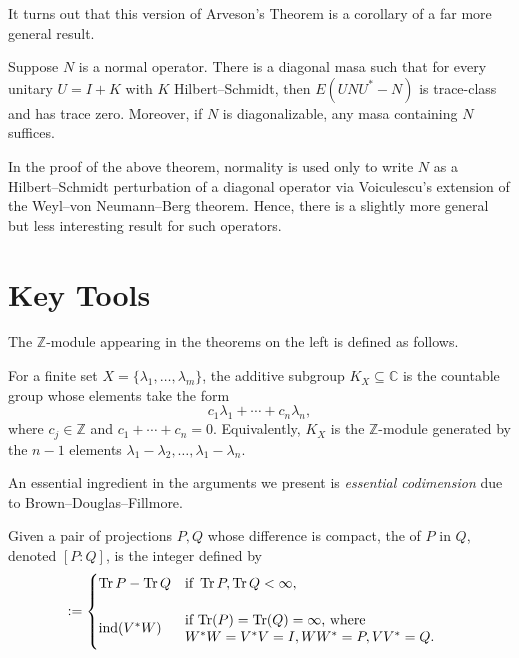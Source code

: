 \documentclass{article}
\DeclareMathOperator{\trace}{Tr}
\DeclareMathOperator{\ind}{ind}
\begin{document}
It turns out that this version of Arveson's Theorem is a corollary of a far more general result.

\begin{theorem}
  Suppose $N$ is a normal operator.
  There is a diagonal masa such that for every unitary $U = I + K$ with $K$ Hilbert--Schmidt, then $E(UNU^{*}-N)$ is trace-class and has trace zero.
  Moreover, if $N$ is diagonalizable, any masa containing $N$ suffices.
\end{theorem}

\begin{remark}
  In the proof of the above theorem, normality is used only to write $N$ as a Hilbert--Schmidt perturbation of a diagonal operator via Voiculescu's extension of the Weyl--von Neumann--Berg theorem.
  Hence, there is a slightly more general but less interesting result for such operators.
\end{remark}

\framebreak

\section*{Key Tools}

The $\mathbb{Z}$-module appearing in the theorems on the left is defined as follows.

\begin{definition}
  For a finite set $X = \{\lambda_1,\ldots,\lambda_m\}$, the additive subgroup $K_X \subseteq \mathbb{C}$ is the countable group whose elements take the form
  \begin{equation*}
    c_1 \lambda_1 + \cdots + c_n \lambda_n,
  \end{equation*}
  where $c_j \in \mathbb{Z}$ and $c_1 + \cdots + c_n = 0$.
  Equivalently, $K_X$ is the $\mathbb{Z}$-module generated by the $n-1$ elements $\lambda_1-\lambda_2,\ldots,\lambda_1-\lambda_n$.
\end{definition}

An essential ingredient in the arguments we present is \emph{essential codimension} due to Brown--Douglas--Fillmore.

\begin{definition}
  Given a pair of projections $P,Q$ whose difference is compact, the  of $P$ in $Q$, denoted $[P:Q]$, is the integer defined by
  \begin{equation*}
    [P:Q] :=
    \begin{cases}
      \trace P-\trace Q & \text{if}\ \trace P,\trace Q < \infty, \\[1em]
      \ind(V^{*}W) & \parbox[c][3em]{0.55\textwidth}{if $\trace(P) = \trace(Q) = \infty$, where \\
        $W^{*}W = V^{*}V = I, WW^{*} = P, VV^{*} = Q$.} \\[0.4em]
    \end{cases}
  \end{equation*}
\end{definition}
\end{document}
